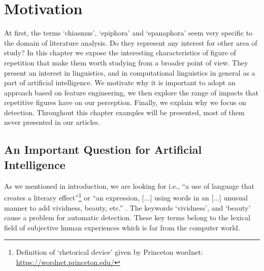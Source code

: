 %
\chapter{Motivation\label{chap2}}
At first, the terms `chiasmus', `epiphora' and `epanaphora' seem very specific to the domain of literature analysis. Do they represent any interest for other area of study? In this chapter we expose the interesting characteristics of figure of repetition that make them worth studying from a broader point of view. They present an interest in linguistics, and in computational linguistics in general as a part of artificial intelligence. We motivate why it is important to adopt an approach based on feature engineering, we then explore the range of impacts that repetitive figures have on our perception. Finally, we explain why we focus on detection. Throughout this chapter examples will be presented, most of them never presented in our articles.
\section{An Important Question for Artificial Intelligence}
As we mentioned in introduction, we are looking for  i.e., ``a use of language that creates a literary effect''\footnote{Definition of `rhetorical device' given by Princeton wordnet: \url{https://wordnet.princeton.edu/}} or ``an expression, [...] using words in an [...] unusual manner to add vividness, beauty, etc.'' \citep{webster1997}.
The keywords `vividness', and `beauty' cause a problem for automatic detection. These key terms belong to the lexical field of subjective human experiences which is far from the computer world. 

